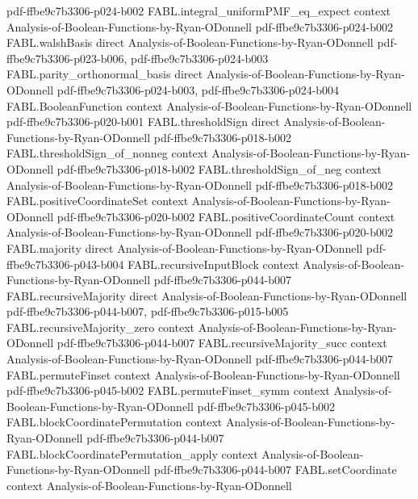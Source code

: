 \begin{theorem}
  {pdf-ffbe9c7b3306-p024-b002}
\proofstep
  {FABL.integral_uniformPMF_eq_expect}
  {context}
  {Analysis-of-Boolean-Functions-by-Ryan-ODonnell}
  {pdf-ffbe9c7b3306-p024-b002}
\proofstep
  {FABL.walshBasis}
  {direct}
  {Analysis-of-Boolean-Functions-by-Ryan-ODonnell}
  {pdf-ffbe9c7b3306-p023-b006,
    pdf-ffbe9c7b3306-p024-b003}
\proofstep
  {FABL.parity_orthonormal_basis}
  {direct}
  {Analysis-of-Boolean-Functions-by-Ryan-ODonnell}
  {pdf-ffbe9c7b3306-p024-b003,
    pdf-ffbe9c7b3306-p024-b004}
\proofstep
  {FABL.BooleanFunction}
  {context}
  {Analysis-of-Boolean-Functions-by-Ryan-ODonnell}
  {pdf-ffbe9c7b3306-p020-b001}
\proofstep
  {FABL.thresholdSign}
  {direct}
  {Analysis-of-Boolean-Functions-by-Ryan-ODonnell}
  {pdf-ffbe9c7b3306-p018-b002}
\proofstep
  {FABL.thresholdSign_of_nonneg}
  {context}
  {Analysis-of-Boolean-Functions-by-Ryan-ODonnell}
  {pdf-ffbe9c7b3306-p018-b002}
\proofstep
  {FABL.thresholdSign_of_neg}
  {context}
  {Analysis-of-Boolean-Functions-by-Ryan-ODonnell}
  {pdf-ffbe9c7b3306-p018-b002}
\proofstep
  {FABL.positiveCoordinateSet}
  {context}
  {Analysis-of-Boolean-Functions-by-Ryan-ODonnell}
  {pdf-ffbe9c7b3306-p020-b002}
\proofstep
  {FABL.positiveCoordinateCount}
  {context}
  {Analysis-of-Boolean-Functions-by-Ryan-ODonnell}
  {pdf-ffbe9c7b3306-p020-b002}
\proofstep
  {FABL.majority}
  {direct}
  {Analysis-of-Boolean-Functions-by-Ryan-ODonnell}
  {pdf-ffbe9c7b3306-p043-b004}
\proofstep
  {FABL.recursiveInputBlock}
  {context}
  {Analysis-of-Boolean-Functions-by-Ryan-ODonnell}
  {pdf-ffbe9c7b3306-p044-b007}
\proofstep
  {FABL.recursiveMajority}
  {direct}
  {Analysis-of-Boolean-Functions-by-Ryan-ODonnell}
  {pdf-ffbe9c7b3306-p044-b007,
    pdf-ffbe9c7b3306-p015-b005}
\proofstep
  {FABL.recursiveMajority_zero}
  {context}
  {Analysis-of-Boolean-Functions-by-Ryan-ODonnell}
  {pdf-ffbe9c7b3306-p044-b007}
\proofstep
  {FABL.recursiveMajority_succ}
  {context}
  {Analysis-of-Boolean-Functions-by-Ryan-ODonnell}
  {pdf-ffbe9c7b3306-p044-b007}
\proofstep
  {FABL.permuteFinset}
  {context}
  {Analysis-of-Boolean-Functions-by-Ryan-ODonnell}
  {pdf-ffbe9c7b3306-p045-b002}
\proofstep
  {FABL.permuteFinset_symm}
  {context}
  {Analysis-of-Boolean-Functions-by-Ryan-ODonnell}
  {pdf-ffbe9c7b3306-p045-b002}
\proofstep
  {FABL.blockCoordinatePermutation}
  {context}
  {Analysis-of-Boolean-Functions-by-Ryan-ODonnell}
  {pdf-ffbe9c7b3306-p044-b007}
\proofstep
  {FABL.blockCoordinatePermutation_apply}
  {context}
  {Analysis-of-Boolean-Functions-by-Ryan-ODonnell}
  {pdf-ffbe9c7b3306-p044-b007}
\proofstep
  {FABL.setCoordinate}
  {context}
  {Analysis-of-Boolean-Functions-by-Ryan-ODonnell}

\end{theorem}
